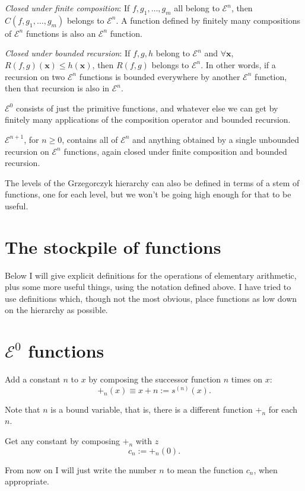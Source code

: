 \documentclass[a4paper]{article}
\newcommand{\grz}[1]{$\mathcal{E}^{#1}$}	%
\newcommand{\xvec}{\mathbf{x}}	%
\theoremstyle{plain}
\theoremstyle{definition}
\begin{document}
{\it Closed under finite composition}: If $f, g_1, \dots, g_m$ all belong to \grz{n}, then $C(f,g_1, \dots, g_m)$ belongs to \grz{n}. A function defined by finitely many compositions of \grz{n} functions is also an \grz{n} function.

{\it Closed under bounded recursion}: If $f,g,h$ belong to \grz{n} and $\forall \xvec$, $R(f,g)(\xvec) \leq h(\xvec)$, then $R(f,g)$ belongs to \grz{n}. In other words, if a recursion on two \grz{n} functions is bounded everywhere by another \grz{n} function, then that recursion is also in \grz{n}.

\grz{0} consists of just the primitive functions, and whatever else we can get by finitely many applications of the composition operator and bounded recursion.

\grz{n+1}, for $n \geq 0$, contains all of \grz{n} and anything obtained by a single unbounded recursion on \grz{n} functions, again closed under finite composition and bounded recursion.

The levels of the Grzegorczyk hierarchy can also be defined in terms of a stem of functions, one for each level, but we won't be going high enough for that to be useful.

\section{The stockpile of functions}
Below I will give explicit definitions for the operations of elementary arithmetic, plus some more useful things, using the notation defined above. I have tried to use definitions which, though not the most obvious, place functions as low down on the hierarchy as possible.

\section{\grz{0} functions}
Add a constant $n$ to $x$ by composing the successor function $n$ times on $x$:
\begin{equation} +_n(x) \equiv x + n := s^{(n)}(x). \end{equation}

Note that $n$ is a bound variable, that is, there is a different function $+_n$ for each $n$.

Get any constant by composing $+_n$ with $z$
\begin{equation} c_n := +_n(0). \end{equation}

From now on I will just write the number $n$ to mean the function $c_n$, when appropriate.
\end{document}
